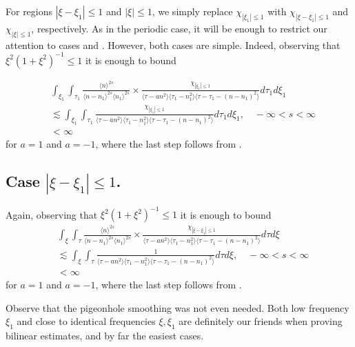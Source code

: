 \documentclass[12pt,reqno]{amsart}
\numberwithin{equation}{section}  %
\renewcommand{\cref}{\Cref}
\begin{document}
%
%
For regions $| \xi - \xi_{1} | \le 1$ and $|\xi| \le 1$, we simply replace $\chi_{| \xi_{1}| \le 1}$ with $\chi_{| \xi - \xi_{1} | \le 1}$ and $\chi_{|\xi| \le 1}$, respectively.
%
As in the periodic case, it will be enough to 
restrict our attention to cases  and .
However, both cases are simple. Indeed, observing that
$\xi^{2}(1 + \xi^{2})^{-1} \le 1$
it is enough to bound


\begin{equation}
  \label{region-4-1-np-d}
\begin{split}
 & \int_{\xi_{1}} \int_{\tau_{1}} \frac{\langle n \rangle ^{2s}}{\langle n - n_{1}\rangle ^{2s} \langle n_{1} \rangle^{2s}}  \times \frac{\chi_{| \xi_{1} | \le 1} }{\langle \tau - an^{2} \rangle \langle
      \tau_{1} - n_{1}^{2} \rangle  \langle \tau - \tau_{1} - (n - n_{1})^{2} \rangle} d \tau_{1} d \xi_{1}
  \\
  & \lesssim
\int_{\xi_{1}} \int_{\tau_{1}} \frac{\chi_{| \xi_{1} | \le 1} }{\langle \tau - an^{2} \rangle \langle
      \tau_{1} - n_{1}^{2} \rangle  \langle \tau - \tau_{1} - (n - n_{1})^{2} \rangle} d \tau_{1} d \xi_{1}, \quad -\infty < s < \infty
  \\
  & < \infty 
  \end{split}
\end{equation}
for $a=1$ and $a=-1$, where the last step follows from \cref{lem:calc}. 
\subsection{Case $| \xi - \xi_{1}| \le 1$.} 
Again, observing that
$\xi^{2}(1 + \xi^{2})^{-1} \le 1$
it is enough to bound
 \begin{equation}
  \label{region-4-1-np-e}
\begin{split}
 & \int_{\xi} \int_{\tau} \frac{\langle n \rangle ^{2s}}{\langle n - n_{1}\rangle ^{2s} \langle n_{1} \rangle^{2s}}  \times \frac{\chi_{| \xi - \xi_{1} | \le 1} }{\langle \tau - an^{2} \rangle \langle
      \tau_{1} - n_{1}^{2} \rangle  \langle \tau - \tau_{1} - (n - n_{1})^{2} \rangle} d \tau d \xi
  \\
  & \lesssim
\int_{\xi} \int_{\tau} \frac{1}{\langle \tau - an^{2} \rangle \langle
      \tau_{1} - n_{1}^{2} \rangle  \langle \tau - \tau_{1} - (n - n_{1})^{2} \rangle} d \tau d \xi, \quad -\infty < s < \infty
  \\
  & < \infty 
  \end{split}
\end{equation}
for $a = 1$ and $a=-1$, where the last step follows from \cref{lem:calc}. 
  \begin{framed}
  Observe that the pigeonhole smoothing was not even needed. Both low frequency $\xi_{1}$ and close to identical frequencies $\xi, \xi_{1}$ are definitely our friends when proving bilinear estimates, and by far the easiest cases.
  \end{framed}
%
\end{document}
